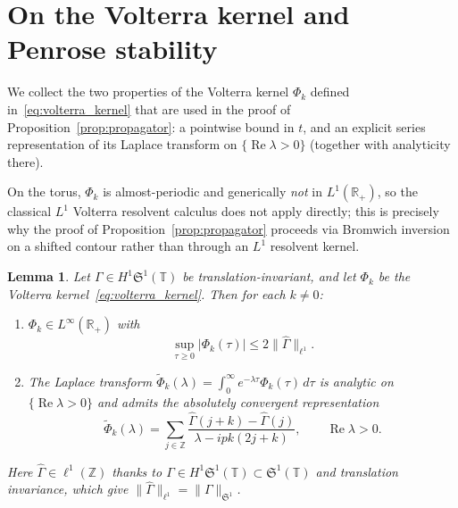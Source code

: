\documentclass[11pt]{amsart}
\newtheorem{lemma}[theorem]{Lemma}
\theoremstyle{definition}
\newcommand{\R}{\mathbb{R}}
\newcommand{\T}{\mathbb{T}}
\newcommand{\Z}{\mathbb{Z}}
\newcommand{\Sp}{\mathfrak{S}}
\begin{document}
\appendix

\section{On the Volterra kernel and Penrose stability}
\label{app:volterra}

We collect the two properties of the Volterra kernel $\Phi_k$ defined in~\eqref{eq:volterra_kernel} that are used in the proof of Proposition~\ref{prop:propagator}: a pointwise bound in $t$, and an explicit series representation of its Laplace transform on $\{\operatorname{Re}\lambda>0\}$ (together with analyticity there).

On the torus, $\Phi_k$ is almost-periodic and generically \emph{not} in $L^1(\R_+)$, so the classical $L^1$ Volterra resolvent calculus %
does not apply directly; this is precisely why the proof of Proposition~\ref{prop:propagator} proceeds via Bromwich inversion on a shifted contour rather than through an $L^1$ resolvent kernel.

\begin{lemma}\label{lem:kernel_L1}
Let $\Gamma\in H^1\Sp^1(\T)$ be translation-invariant, and let $\Phi_k$ be the Volterra kernel~\eqref{eq:volterra_kernel}. Then for each $k\ne 0$:
\begin{enumerate}
\item[(i)] $\Phi_k\in L^\infty(\R_+)$
with
\begin{equation}\label{eq:phi_k_sup}
  \sup_{\tau\ge 0}|\Phi_k(\tau)|
  \le 2\|\hat\Gamma\|_{\ell^1}.
\end{equation}
\item[(ii)] The Laplace transform
$\tilde\Phi_k(\lambda) =\int_0^\infty e^{-\lambda\tau} \Phi_k(\tau)\,d\tau$ is analytic on $\{\operatorname{Re}\lambda>0\}$ and admits the absolutely convergent representation
\begin{equation}\label{eq:phi_k_laplace}
  \tilde\Phi_k(\lambda)
  = \sum_{j\in\Z}
  \frac{\hat\Gamma(j{+}k)-\hat\Gamma(j)}
  {\lambda-ipk(2j+k)},
  \qquad
  \operatorname{Re}\lambda>0.
\end{equation}
\end{enumerate}
Here $\hat\Gamma\in\ell^1(\Z)$ thanks to $\Gamma\in H^1\Sp^1(\T)\subset\Sp^1(\T)$ and translation invariance, which give $\|\hat\Gamma\|_{\ell^1} =\|\Gamma\|_{\Sp^1}$.
\end{lemma}
\end{document}
